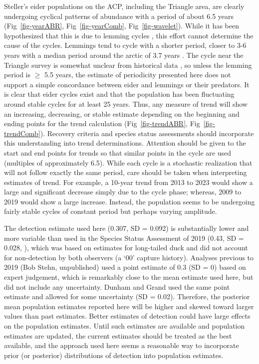 \documentclass[
  10pt,
  letterpaper,
]{article}
\begin{document}
Steller's eider populations on the ACP, including the Triangle area, are
clearly undergoing cyclical patterns of abundance with a period of about
6.5 years (Fig~\ref{fig-yearABR}, Fig~\ref{fig-yearComb},
Fig~\ref{fig-wavelet}). While it has been hypothesized that this is due
to lemming cycles \citep{quakenbush2004breeding}, this effort cannot
determine the cause of the cycles. Lemmings tend to cycle with a shorter
period, closer to 3-6 years with a median period around the arctic of
3.7 years \citep{gauthier2024taking}. The cycle near the Triangle survey
is somewhat unclear from historical data \citep{pitelka2018demography},
so unless the lemming period is \(\ge\) 5.5 years, the estimate of
periodicity presented here does not support a simple concordance between
eider and lemmings or their predators. It is clear that eider cycles
exist and that the population has been fluctuating around stable cycles
for at least 25 years. Thus, any measure of trend will show an
increasing, decreasing, or stable estimate depending on the beginning
and ending points for the trend calculation (Fig~\ref{fig-trendABR},
Fig~\ref{fig-trendComb}). Recovery criteria and species status
assessments should incorporate this understanding into trend
determinations. Attention should be given to the start and end points
for trends so that similar points in the cycle are used (multiples of
approximately 6.5). While each cycle is a stochastic realization that
will not follow exactly the same period, care should be taken when
interpreting estimates of trend. For example, a 10-year trend from 2013
to 2023 would show a large and significant decrease simply due to the
cycle phase; whereas, 2009 to 2019 would show a large increase. Instead,
the population seems to be undergoing fairly stable cycles of constant
period but perhaps varying amplitude.

The detection estimate used here (0.307, SD = 0.092) is substantially
lower and more variable than used in the Species Status Assessment of
2019 (0.43, SD = 0.028, \citep{steiSSA2019}), which was based on
estimates for long-tailed duck and did not account for non-detection by
both observers (a `00' capture history). Analyses previous to 2019 (Bob
Stehn, unpublished) used a point estimate of 0.3 (SD = 0) based on
expert judgement, which is remarkably close to the mean estimate used
here, but did not include any uncertainty. Dunham and Grand
\citep{dunham2017evaluating} used the same point estimate and allowed
for some uncertainty (SD = 0.02). Therefore, the posterior mean
population estimates reported here will be higher and skewed toward
larger values than past estimates. Better estimates of detection could
have large effects on the population estimates. Until such estimates are
available and population estimates are updated, the current estimates
should be treated as the best available, and the approach used here
seems a reasonable way to incorporate prior (or posterior) distributions
of detection into population estimates.
\end{document}
